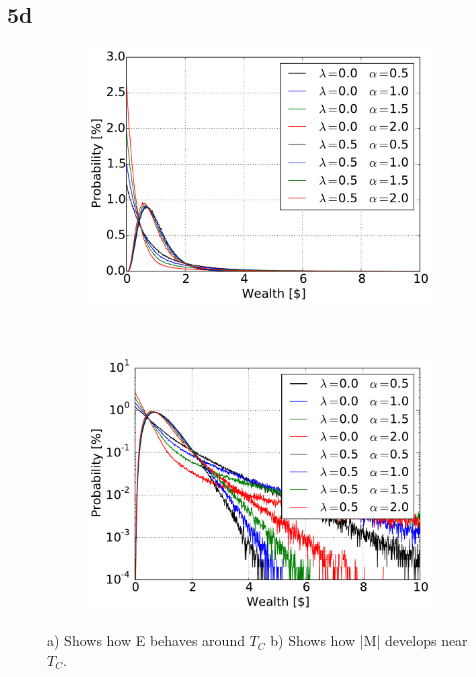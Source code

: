 \pagebreak
\subsection{5d}
\begin{figure}[H]
    \centering
    \begin{subfigure}{0.5\textwidth}
        \centering
        \includegraphics[width=\linewidth]{result/bilder/5d-0050}
        \caption{}
    \end{subfigure}%
    ~ 
    \begin{subfigure}{0.5\textwidth}
        \centering
        \includegraphics[width=\linewidth]{result/bilder/5d-0050-log}
        \caption{}
    \end{subfigure}
    \caption{a) Shows how E behaves around $T_C$ b) Shows how |M| develops near $T_C$.}
    \label{fig:5d-0050}
\end{figure}




